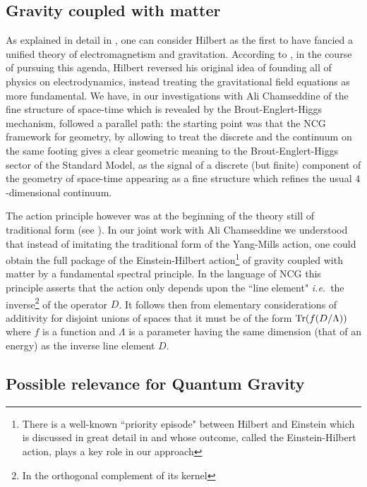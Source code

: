\documentclass[12pt]{article}
\def\Tr{{\rm Tr}}
\def\Tr{{\rm Tr}}
\newcommand{\ie}{{\it i.e.\/}\ }
\begin{document}
\subsection{Gravity coupled with matter}\label{sect hilbert}
   
As explained in detail in \cite{corry}, one can consider Hilbert as the first to have fancied a unified theory of electromagnetism and gravitation.
According to \cite{corry}, in the course of pursuing this agenda, Hilbert  reversed his original idea of founding all of physics on electrodynamics, instead  treating the gravitational field equations as more fundamental. We have, in our investigations with Ali Chamseddine of the fine structure of space-time which is revealed by the Brout-Englert-Higgs mechanism, followed a parallel path: the starting point was that the NCG framework for geometry, by allowing to treat the discrete and the continuum on the same footing gives a clear geometric meaning to the Brout-Englert-Higgs sector of the Standard Model, as the signal of a discrete (but finite) component of the geometry of space-time appearing as a fine structure which refines the usual $4$-dimensional continuum.

 The action principle however was at the beginning of the theory still of traditional form (see \cite{Co-book}). In our joint work with Ali Chamseddine \cite{cc2} we understood that instead of imitating the traditional form of the Yang-Mills action, one could obtain the full package of the Einstein-Hilbert action\footnote{There is a well-known ``priority episode" between Hilbert and Einstein which is discussed in great detail in  \cite{corry,KS} and whose outcome, called the Einstein-Hilbert action, plays a key role in our approach} of gravity coupled with matter by a fundamental spectral principle. In the language of NCG this principle asserts that the action only depends upon the ``line element" \ie the inverse\footnote{In the orthogonal complement of its kernel} of the operator $D$. It follows then from elementary considerations of additivity for disjoint unions of spaces  that it must be of the form $\Tr(f(D/\Lambda))$ where $f$ is a function and $\Lambda$ is a parameter having the same dimension (that of an energy) as the inverse line element $D$. 

\subsection{Possible relevance for Quantum Gravity}\label{sect QG}
\end{document}

